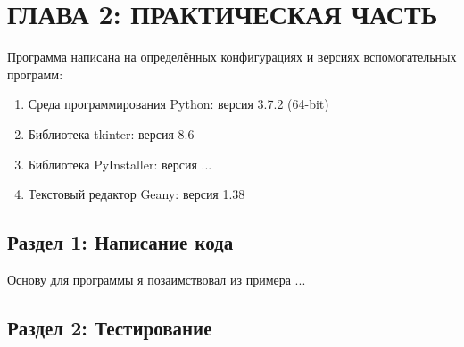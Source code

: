 \chapter{\label{ch:ch02}ГЛАВА 2: ПРАКТИЧЕСКАЯ ЧАСТЬ}

Программа написана на определённых конфигурациях и версиях вспомогательных программ:

\begin{enumerate}
\item Среда программирования Python: версия 3.7.2 (64-bit)
\item Библиотека tkinter: версия 8.6
\item Библиотека PyInstaller: версия ...
\item Текстовый редактор Geany: версия 1.38
\end{enumerate}

\section{\label{sec:ch02/sec01}Раздел 1: Написание кода}

Основу для программы я позаимствовал из примера ...

\section{\label{sec:ch02/sec02}Раздел 2: Тестирование}